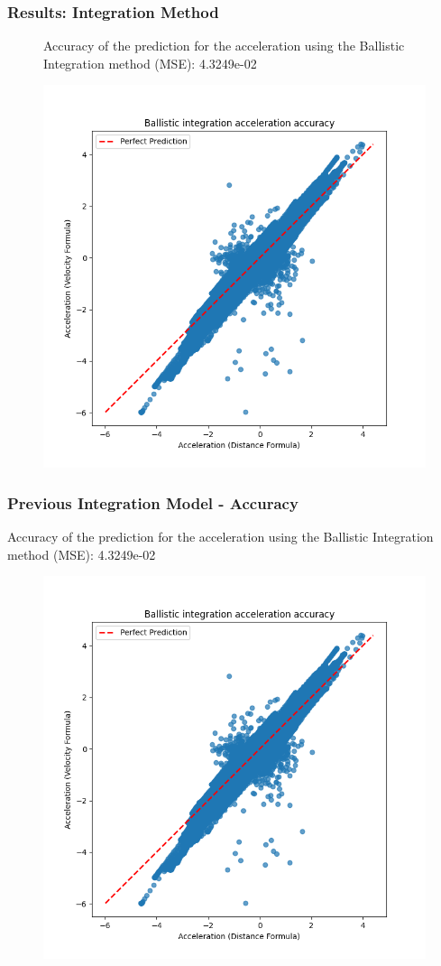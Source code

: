 \begin{frame}
  \frametitle{Results: Integration Method}
  \begin{figure}
    \centering
    \begin{minipage}[b]{0.45\linewidth}
        Accuracy of the prediction for the acceleration using the Ballistic Integration method (MSE):  4.3249e-02
    \end{minipage}
    \begin{minipage}[b]{0.45\linewidth}
      \centering
        \includegraphics[width=\textwidth]{figures/graphs/Ballistic integration acceleration accuracy.png}
    \end{minipage}
  \end{figure}
\end{frame}


\begin{frame}
  \frametitle{Previous Integration Model - Accuracy}
  Accuracy of the prediction for the acceleration using the Ballistic Integration method (MSE):  4.3249e-02
  \begin{figure}
      \centering
        \includegraphics[width=0.5 \textwidth]{figures/graphs/Ballistic integration acceleration accuracy.png}
  \end{figure}

\end{frame}

